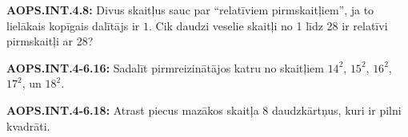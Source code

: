 \documentclass[11pt]{article}
\newenvironment{uzdevums}[1][\unskip]{%
\vspace{3mm}
\noindent
\textbf{#1:}
\noindent}
{}
\begin{document}
\begin{uzdevums}[AOPS.INT.4.8]
Divus skaitļus sauc par ``relatīviem pirmskaitļiem'', ja to lielākais kopīgais dalītājs ir $1$. Cik daudzi veselie skaitļi no 1 līdz 28 ir 
relatīvi pirmskaitļi ar 28? 
\end{uzdevums}


\begin{uzdevums}[AOPS.INT.4-6.16]
Sadalīt pirmreizinātājos katru no skaitļiem $14^2$, $15^2$, $16^2$, $17^2$, un $18^2$.
\end{uzdevums}


\begin{uzdevums}[AOPS.INT.4-6.18]
Atrast piecus mazākos skaitļa 8 daudzkārtņus, kuri ir pilni kvadrāti. 
\end{uzdevums}
\end{document}
